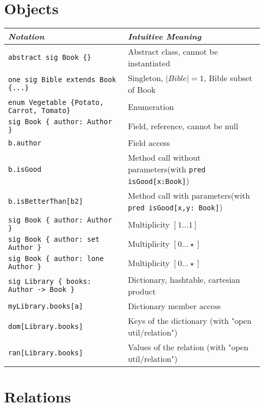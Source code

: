 \documentclass{article}
\newlength\tw
\begin{document}
\section{Objects}

\begin{longtable}{|p{\tw}|p{\tw}|}
\hline
\emph{Notation} & \emph{Intuitive Meaning} \\
\hline
\texttt{abstract sig Book \{\}} & Abstract class, cannot be instantiated \\
\hline
\texttt{one sig Bible extends Book \{...\}} & Singleton, $|Bible| = 1$, Bible subset of Book \\
\hline
\texttt{enum Vegetable \{Potato, Carrot, Tomato\}} & Enumeration \\
\hline
\texttt{sig Book \{ author: Author \}} & Field, reference, cannot be null \\
\hline
\texttt{b.author} & Field access\\
\hline
\texttt{b.isGood} & Method call without parameters\newline (with \texttt{pred  isGood[x:Book]}) \\
\hline
\texttt{b.isBetterThan[b2]} & Method call with parameters\newline (with \texttt{pred  isGood[x,y: Book]}) \\
\hline
\texttt{sig Book \{ author: Author \}} & Multiplicity $[1\ldots1]$ \\
\hline
\texttt{sig Book \{ author: set Author \}} & Multiplicity $[0\ldots\star]$ \\
\hline
\texttt{sig Book \{ author: lone Author \}} & Multiplicity $[0\ldots\star]$ \\
\hline
\texttt{sig Library \{ books: Author -> Book \}} & Dictionary, hashtable, cartesian product\\
\hline
\texttt{myLibrary.books[a]} & Dictionary member access\\
\hline
\texttt{dom[Library.books]} & Keys of the dictionary (with "open util/relation")\\
\hline
\texttt{ran[Library.books]} & Values of the relation (with "open util/relation") \\
\hline
\end{longtable}

\section{Relations}
\end{document}
